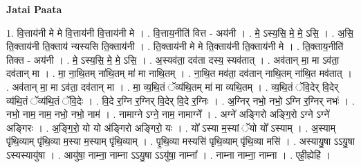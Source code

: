 \documentclass[17pt]{extarticle}
\begin{document}
\textbf{Jatai Paata} \newline

1. वि॒त्ताय॑नी मे मे वि॒त्ताय॑नी वि॒त्ताय॑नी मे । . वि॒त्ताय॒नीति॑ वित्त - अय॑नी । . मे॒ ऽस्य॒सि॒ मे॒ मे॒ ऽसि॒ । . अ॒सि॒ ति॒क्ताय॑नी ति॒क्ताय॑ न्यस्यसि ति॒क्ताय॑नी । . ति॒क्ताय॑नी मे मे ति॒क्ताय॑नी ति॒क्ताय॑नी मे । . ति॒क्ताय॒नीति॑ तिक्त - अय॑नी । . मे॒ ऽस्य॒सि॒ मे॒ मे॒ ऽसि॒ । . अ॒स्यव॑ता॒ दव॑ता दस्य॒ स्यव॑तात् । . अव॑तान् मा॒ मा ऽव॑ता॒ दव॑तान् मा । . मा॒ ना॒थि॒तम् ना॑थि॒तम् मा॑ मा नाथि॒तम् । . ना॒थि॒त मव॑ता॒ दव॑तान् नाथि॒तम् ना॑थि॒त मव॑तात् । . अव॑तान् मा॒ मा ऽव॑ता॒ दव॑तान् मा । . मा॒ व्य॒थि॒तं ॅव्य॑थि॒तम् मा॑ मा व्यथि॒तम् । . व्य॒थि॒तं ॅवि॒देर् वि॒देर् व्य॑थि॒तं ॅव्य॑थि॒तं ॅवि॒देः । . वि॒दे र॒ग्नि र॒ग्निर् वि॒देर् वि॒दे र॒ग्निः । . अ॒ग्निर् नभो॒ नभो॒ ऽग्नि र॒ग्निर् नभः॑ । . नभो॒ नाम॒ नाम॒ नभो॒ नभो॒ नाम॑ । . नामाग्ने ऽग्ने॒ नाम॒ नामाग्ने᳚ । . अग्ने॑ अङ्गिरो अङ्गि॒रो ऽग्ने ऽग्ने॑ अङ्गिरः । . अ॒ङ्गि॒रो॒ यो यो अ॑ङ्गिरो अङ्गिरो॒ यः । . यो᳚ ऽस्या म॒स्यां ॅयो यो᳚ ऽस्याम् । . अ॒स्याम् पृ॑थि॒व्याम् पृ॑थि॒व्या म॒स्या म॒स्याम् पृ॑थि॒व्याम् । . पृ॒थि॒व्या मस्यसि॑ पृथि॒व्याम् पृ॑थि॒व्या मसि॑ । . अस्यायु॒षा ऽऽयु॒षा ऽस्यस्यायु॑षा । . आयु॑षा॒ नाम्ना॒ नाम्ना ऽऽयु॒षा ऽऽयु॑षा॒ नाम्ना᳚ । . नाम्ना नाम्ना॒ नाम्ना । . एही॒ह्येहि॑ । \newline
\end{document}
